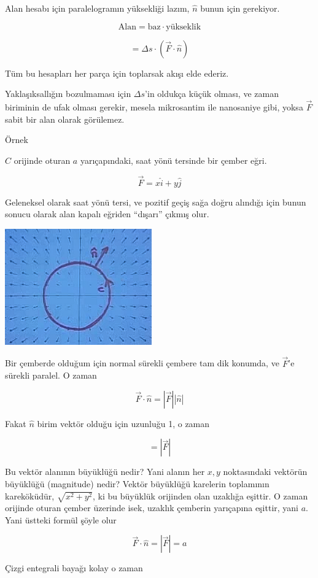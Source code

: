 \documentclass[12pt,fleqn]{article}\usepackage{../../common}
\begin{document}
Alan hesabı için paralelogramın yüksekliği lazım, $\hat{n}$ bunun için
gerekiyor. 

$$ \textrm{Alan}  = \textrm{baz} \cdot \textrm{yükseklik} $$

$$ = \Delta s \cdot (\vec{F} \cdot \hat{n} )$$

Tüm bu hesapları her parça için toplarsak akışı elde ederiz. 

Yaklaşıksallığın bozulmaması için $\Delta s$'in oldukça küçük olması, ve
zaman biriminin de ufak olması gerekir, mesela mikrosantim ile nanosaniye
gibi, yoksa $\vec{F}$ sabit bir alan olarak görülemez. 

Örnek

$C$ orijinde oturan $a$ yarıçapındaki, saat yönü tersinde bir çember eğri. 

$$ \vec{F} = x\hat{i} + y\hat{j} $$

Geleneksel olarak saat yönü tersi, ve pozitif geçiş sağa doğru alındığı
için bunun sonucu olarak alan kapalı eğriden ``dışarı'' çıkmış olur. 

\includegraphics[height=5cm]{23_6.png}

Bir çemberde olduğum için normal sürekli çembere tam dik konumda, ve
$\vec{F}$'e sürekli paralel. O zaman 

$$ \vec{F} \cdot \hat{n} = |\vec{F}||\hat{n}| $$

Fakat $\hat{n}$ birim vektör olduğu için uzunluğu 1, o zaman

$$  = |\vec{F}| $$

Bu vektör alanının büyüklüğü nedir? Yani alanın her $x,y$ noktasındaki
vektörün büyüklüğü (magnitude) nedir? Vektör büyüklüğü karelerin toplamının
kareköküdür, $\sqrt{x^2 + y^2}$, ki bu büyüklük orijinden olan uzaklığa
eşittir. O zaman orijinde oturan çember üzerinde isek, uzaklık çemberin
yarıçapına eşittir, yani $a$. Yani üstteki formül şöyle olur

$$ \vec{F} \cdot \hat{n} = |\vec{F}| = a$$

Çizgi entegrali bayağı kolay o zaman
\end{document}
